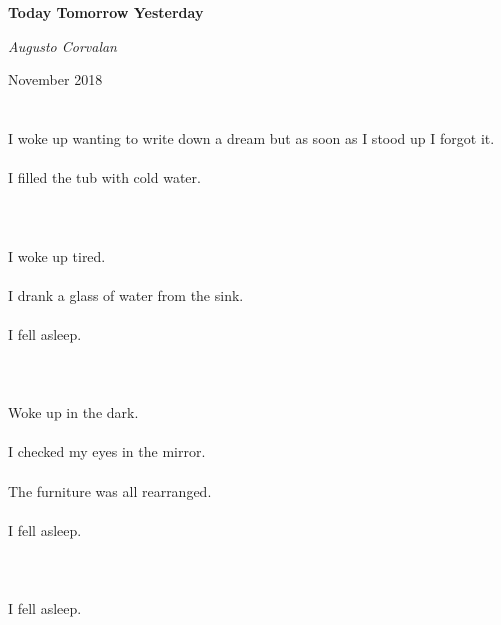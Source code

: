 \documentclass{article}
\begin{document}
    \begin{titlepage}
    \centering
    \begin{center}
    \vspace{5cm}
    {\huge\bfseries Today Tomorrow Yesterday \par}
    \vspace{2cm}
    {\Large\itshape Augusto Corvalan\par}
    \vfill
    {\large November 2018\par}
    \end{center}
    \end{titlepage}

    
    \section{}
    I woke up wanting to write down a dream but as soon as I stood up I forgot it.\\\\I filled the tub with cold water.\\\\ 
    \newpage
    
    \section{}
    I woke up tired.\\\\I drank a glass of water from the sink.\\\\I fell asleep.\\\\ 
    \newpage
    
    \section{}
    Woke up in the dark.\\\\I checked my eyes in the mirror.\\\\The furniture was all rearranged.\\\\I fell asleep.\\\\ 
    \newpage
    
    \section{}
    I fell asleep.\\\\ 
    \newpage
    
\end{document}
